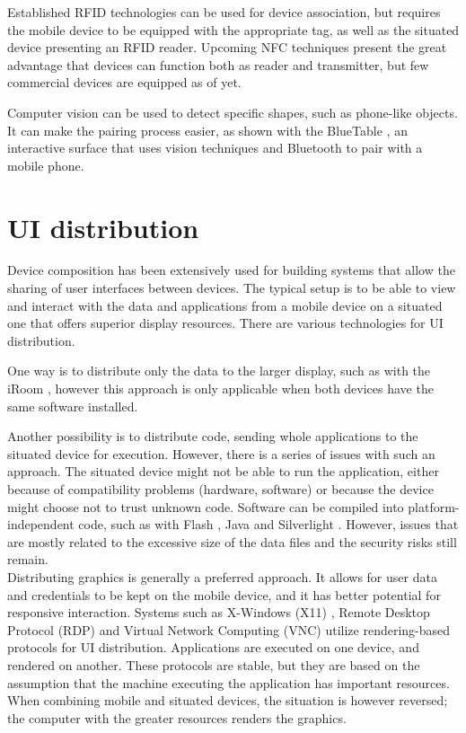 Established RFID technologies can be used for device association, but requires the mobile device to be equipped with the appropriate tag, as well as the situated device presenting an RFID reader.
Upcoming NFC techniques present the great advantage that devices can function both as reader and transmitter, but few commercial devices are equipped as of yet.

Computer vision can be used to detect specific shapes, such as phone-like objects.
It can make the pairing process easier, as shown with the BlueTable \citep{Wilson:2007:bluetable}, an interactive surface that uses vision techniques and Bluetooth to pair with a mobile phone.

\section{UI distribution}
\label{sec:rwdistribution}

Device composition has been extensively used for building systems that allow the sharing of user interfaces between devices.
The typical setup is to be able to view and interact with the data and applications from a mobile device on a situated one that offers superior display resources.
There are various technologies for UI distribution.

One way is to distribute only the data to the larger display, such as with the iRoom \citep{Johanson:2002:iroom}, however this approach is only applicable when both devices have the same software installed.

Another possibility is to distribute code, sending whole applications to the situated device for execution.
However, there is a series of issues with such an approach.
The situated device might not be able to run the application, either because of compatibility problems (hardware, software) or because the device might choose not to trust unknown code.
Software can be compiled into platform-independent code, such as with Flash \citep{flash}, Java \citep{java} and Silverlight \citep{silverlight}.
However, issues that are mostly related to the excessive size of the data files and the security risks still remain.
\\
\linebreak
Distributing graphics is generally a preferred approach.
It allows for user data and credentials to be kept on the mobile device, and it has better potential for responsive interaction.
Systems such as X-Windows (X11) \citep{Scheifler:1986:x11}, Remote Desktop Protocol (RDP) \citep{Tritsch:2003:rdp} and Virtual Network Computing (VNC) \citep{Richardson:1998:vnc} utilize rendering-based protocols for UI distribution.
Applications are executed on one device, and rendered on another.
These protocols are stable, but they are based on the assumption that the machine executing the application has important resources.
When combining mobile and situated devices, the situation is however reversed; the computer with the greater resources renders the graphics.


